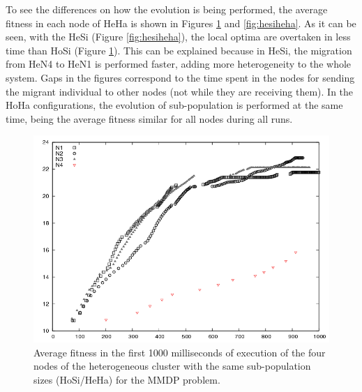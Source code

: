 To see the differences on how the evolution is being performed, the
average fitness in each node of HeHa is shown in Figures
\ref{fig:hosiheha} and \ref{fig:hesiheha}. As it can be seen, with the
HeSi (Figure \ref{fig:hesiheha}), the local optima are overtaken in
less time than HoSi (Figure \ref{fig:hosiheha}).  This can be
explained because in HeSi, the migration from HeN4 to HeN1 is
performed faster, adding more heterogeneity to the whole system. Gaps
in the figures correspond to the time spent in the nodes for sending
the migrant individual to other nodes (not while they are receiving
them). %
 In the HoHa configurations, the evolution of sub-population is
 performed at the same time, being the average fitness similar for all
 nodes during all runs.  


\begin{figure}
\centering
 \includegraphics[scale =0.4] {gfx/adaptiveresults/generationsMMDPhomosize.png}
\caption{Average fitness in the first 1000 milliseconds of execution of the four nodes of the heterogeneous cluster with the same sub-population sizes (HoSi/HeHa) for the MMDP problem.}
\label{fig:hosiheha}
\end{figure}

